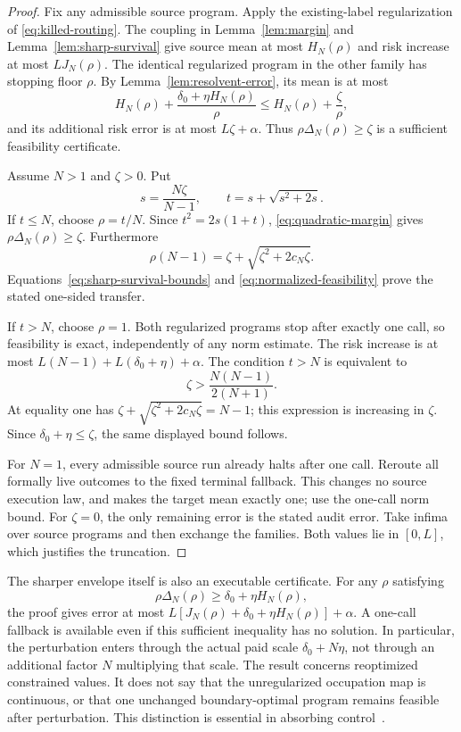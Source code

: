 \begin{proof}
Fix any admissible source program. Apply the existing-label regularization of \eqref{eq:killed-routing}. The coupling in Lemma~\ref{lem:margin} and Lemma~\ref{lem:sharp-survival} give source mean at most $H_N(\rho)$ and risk increase at most $LJ_N(\rho)$. The identical regularized program in the other family has stopping floor $\rho$. By Lemma~\ref{lem:resolvent-error}, its mean is at most
\begin{equation}\label{eq:normalized-feasibility}
 H_N(\rho)+\frac{\delta_0+\eta H_N(\rho)}{\rho}
 \le H_N(\rho)+\frac{\zeta}{\rho},
\end{equation}
and its additional risk error is at most $L\zeta+\alpha$. Thus
$\rho\Delta_N(\rho)\ge\zeta$ is a sufficient feasibility certificate.

Assume $N>1$ and $\zeta>0$. Put
\[
 s=\frac{N\zeta}{N-1},\qquad t=s+\sqrt{s^2+2s}.
\]
If $t\le N$, choose $\rho=t/N$. Since $t^2=2s(1+t)$,
\eqref{eq:quadratic-margin} gives $\rho\Delta_N(\rho)\ge\zeta$.
Furthermore
\[
 \rho(N-1)=\zeta+\sqrt{\zeta^2+2c_N\zeta}.
\]
Equations~\eqref{eq:sharp-survival-bounds} and
\eqref{eq:normalized-feasibility} prove the stated one-sided transfer.

If $t>N$, choose $\rho=1$. Both regularized programs stop after exactly one call, so feasibility is exact, independently of any norm estimate. The risk increase is at most $L(N-1)+L(\delta_0+\eta)+\alpha$. The condition $t>N$ is equivalent to
\[
 \zeta>\frac{N(N-1)}{2(N+1)}.
\]
At equality one has $\zeta+\sqrt{\zeta^2+2c_N\zeta}=N-1$; this expression is increasing in $\zeta$. Since $\delta_0+\eta\le\zeta$, the same displayed bound follows.

For $N=1$, every admissible source run already halts after one call. Reroute all formally live outcomes to the fixed terminal fallback. This changes no source execution law, and makes the target mean exactly one; use the one-call norm bound. For $\zeta=0$, the only remaining error is the stated audit error. Take infima over source programs and then exchange the families. Both values lie in $[0,L]$, which justifies the truncation.
\end{proof}

The sharper envelope itself is also an executable certificate. For any $\rho$ satisfying
\begin{equation}\label{eq:exact-envelope-certificate}
 \rho\Delta_N(\rho)\ge\delta_0+\eta H_N(\rho),
\end{equation}
the proof gives error at most
$L[J_N(\rho)+\delta_0+\eta H_N(\rho)]+\alpha$.
A one-call fallback is available even if this sufficient inequality has no solution. In particular, the perturbation enters through the actual paid scale $\delta_0+N\eta$, not through an additional factor $N$ multiplying that scale. The result concerns reoptimized constrained values. It does not say that the unregularized occupation map is continuous, or that one unchanged boundary-optimal program remains feasible after perturbation. This distinction is essential in absorbing control~\cite{PZ,DPR}.

